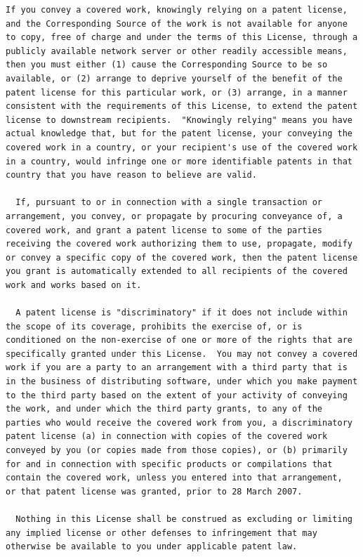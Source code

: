 \documentclass[letterpaper,10pt,english]{sphinxmanual}
\begin{document}
\begin{Verbatim}[commandchars=\\\{\}]
  If you convey a covered work, knowingly relying on a patent license,
and the Corresponding Source of the work is not available for anyone
to copy, free of charge and under the terms of this License, through a
publicly available network server or other readily accessible means,
then you must either (1) cause the Corresponding Source to be so
available, or (2) arrange to deprive yourself of the benefit of the
patent license for this particular work, or (3) arrange, in a manner
consistent with the requirements of this License, to extend the patent
license to downstream recipients.  "Knowingly relying" means you have
actual knowledge that, but for the patent license, your conveying the
covered work in a country, or your recipient's use of the covered work
in a country, would infringe one or more identifiable patents in that
country that you have reason to believe are valid.

  If, pursuant to or in connection with a single transaction or
arrangement, you convey, or propagate by procuring conveyance of, a
covered work, and grant a patent license to some of the parties
receiving the covered work authorizing them to use, propagate, modify
or convey a specific copy of the covered work, then the patent license
you grant is automatically extended to all recipients of the covered
work and works based on it.

  A patent license is "discriminatory" if it does not include within
the scope of its coverage, prohibits the exercise of, or is
conditioned on the non-exercise of one or more of the rights that are
specifically granted under this License.  You may not convey a covered
work if you are a party to an arrangement with a third party that is
in the business of distributing software, under which you make payment
to the third party based on the extent of your activity of conveying
the work, and under which the third party grants, to any of the
parties who would receive the covered work from you, a discriminatory
patent license (a) in connection with copies of the covered work
conveyed by you (or copies made from those copies), or (b) primarily
for and in connection with specific products or compilations that
contain the covered work, unless you entered into that arrangement,
or that patent license was granted, prior to 28 March 2007.

  Nothing in this License shall be construed as excluding or limiting
any implied license or other defenses to infringement that may
otherwise be available to you under applicable patent law.


\end{Verbatim}
\end{document}
